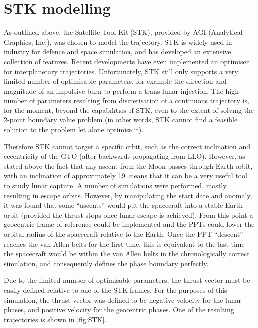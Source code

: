 \section{STK modelling} \label{sec:STK}

As outlined above, the Satellite Tool Kit (STK), provided by AGI (Analytical Graphics, Inc.), was chosen to model the trajectory. STK is widely used in industry for defence and space simulation, and has developed an extensive collection of features. Recent developments have even implemented an optimiser for interplanetary trajectories. Unfortunately, STK still only supports a very limited number of optimisable parameters, for example the direction and magnitude of an impulsive burn to perform a trans-lunar injection. The high number of parameters resulting from discretisation of a continuous trajectory is, for the moment, beyond the capabilities of STK, even to the extent of solving the 2-point boundary value problem (in other words, STK cannot find a feasible solution to the problem let alone optimise it).

Therefore STK cannot target a specific orbit, such as the correct inclination and eccentricity of the GTO (after backwards propagating from LLO). However, as stated above the fact that any ascent from the Moon passes through Earth orbit, with an inclination of approximately 19\degrees\ means that it can be a very useful tool to study lunar capture. A number of simulations were performed, mostly resulting in escape orbits. However, by manipulating the start date and anomaly, it was found that some \enquote{ascents} would put the spacecraft into a stable Earth orbit (provided the thrust stops once lunar escape is achieved). From this point a geocentric frame of reference could be implemented and the PPTs could lower the orbital radius of the spacecraft relative to the Earth. Once the PPT \enquote{descent} reaches the van Allen belts for the first time, this is equivalent to the last time the spacecraft would be within the van Allen belts in the chronologically correct simulation, and consequently defines the phase boundary perfectly.

Due to the limited number of optimisable parameters, the thrust vector must be easily defined relative to one of the STK frames. For the purposes of this simulation, the thrust vector was defined to be negative velocity for the lunar phases, and positive velocity for the geocentric phases. One of the resulting trajectories is shown in \autoref{fig:STK}.

